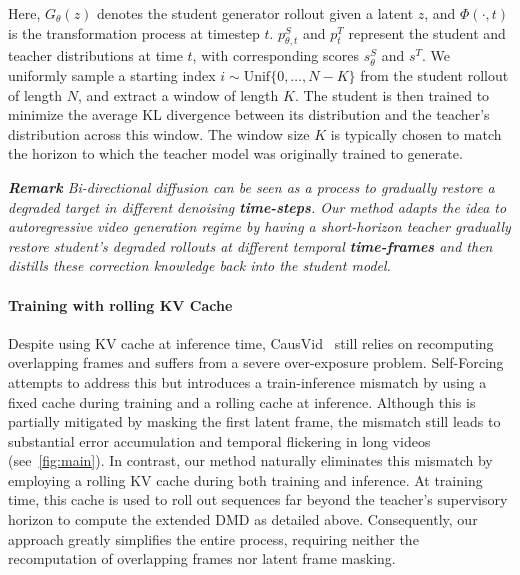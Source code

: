 Here, $G_{\theta}(z)$ denotes the student generator rollout given a latent $z$, and $\Phi(\cdot,t)$ is the transformation process at timestep $t$.  
$p^{S}_{\theta,t}$ and $p^{T}_{t}$ represent the student and teacher distributions at time $t$, with corresponding scores $s^{S}_{\theta}$ and $s^{T}$.  
We uniformly sample a starting index $i \sim \mathrm{Unif}\{0,\dots,N-K\}$ from the student rollout of length $N$, and extract a window of length $K$.  
The student is then trained to minimize the average KL divergence between its distribution and the teacher’s distribution across this window.  
The window size $K$ is typically chosen to match the horizon to which the teacher model was originally trained to generate.

\textit{\textbf{Remark} Bi-directional diffusion can be seen as a process to gradually restore a degraded target in different denoising \textbf{time-steps}. Our method adapts the idea to autoregressive video generation regime by having a short-horizon teacher gradually restore student’s degraded rollouts at different temporal \textbf{time-frames} and then distills these correction knowledge back into the student model.}

\paragraph{Training with rolling KV Cache}

Despite using KV cache at inference time, CausVid~\citep{yin2025causvid}  still relies on recomputing overlapping frames and suffers from a severe over-exposure problem. Self-Forcing~\citep{huang2025self} attempts to address this but introduces a train-inference mismatch by using a fixed cache during training and a rolling cache at inference. Although this is partially mitigated by masking the first latent frame, the mismatch still leads to substantial error accumulation and temporal flickering in long videos (see~\cref{fig:main}).
In contrast, our method naturally eliminates this mismatch by employing a rolling KV cache during both training and inference. At training time, this cache is used to roll out sequences far beyond the teacher's supervisory horizon to compute the extended DMD as detailed above. Consequently, our approach greatly simplifies the entire process, requiring neither the recomputation of overlapping frames nor latent frame masking.

